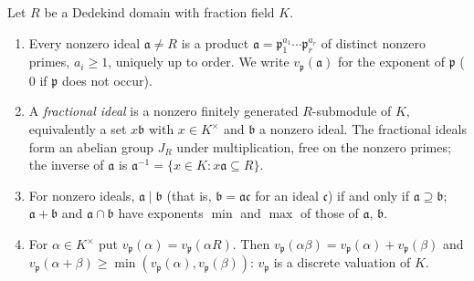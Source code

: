 \begin{theorem}\label{thm:ant:idealfactorisation}
Let $R$ be a Dedekind domain with fraction field $K$.
\begin{enumerate}[label=(\roman*)]
\item Every nonzero ideal $\mathfrak a\ne R$ is a product $\mathfrak a=\mathfrak p_1^{a_1}\cdots\mathfrak p_r^{a_r}$ of distinct nonzero primes, $a_i\ge1$,
uniquely up to order. We write $v_{\mathfrak p}(\mathfrak a)$ for the exponent of $\mathfrak p$ ($0$ if $\mathfrak p$ does not occur).
\item A \emph{fractional ideal} is a nonzero finitely generated $R$-submodule of $K$, equivalently a set $x\mathfrak b$ with $x\in K^\times$ and
$\mathfrak b$ a nonzero ideal. The fractional ideals form an abelian group $J_R$ under multiplication, free on the nonzero primes; the inverse of
$\mathfrak a$ is $\mathfrak a^{-1}=\{x\in K:x\mathfrak a\subseteq R\}$.
\item For nonzero ideals, $\mathfrak a\mid\mathfrak b$ (that is, $\mathfrak b=\mathfrak a\mathfrak c$ for an ideal $\mathfrak c$) if and only if
$\mathfrak a\supseteq\mathfrak b$; $\mathfrak a+\mathfrak b$ and $\mathfrak a\cap\mathfrak b$ have exponents $\min$ and $\max$ of those of $\mathfrak a$, $\mathfrak b$.
\item For $\alpha\in K^\times$ put $v_{\mathfrak p}(\alpha)=v_{\mathfrak p}(\alpha R)$. Then $v_{\mathfrak p}(\alpha\beta)=v_{\mathfrak p}(\alpha)+v_{\mathfrak p}(\beta)$
and $v_{\mathfrak p}(\alpha+\beta)\ge\min(v_{\mathfrak p}(\alpha),v_{\mathfrak p}(\beta))$: $v_{\mathfrak p}$ is a discrete valuation of $K$.
\end{enumerate}
\end{theorem}

